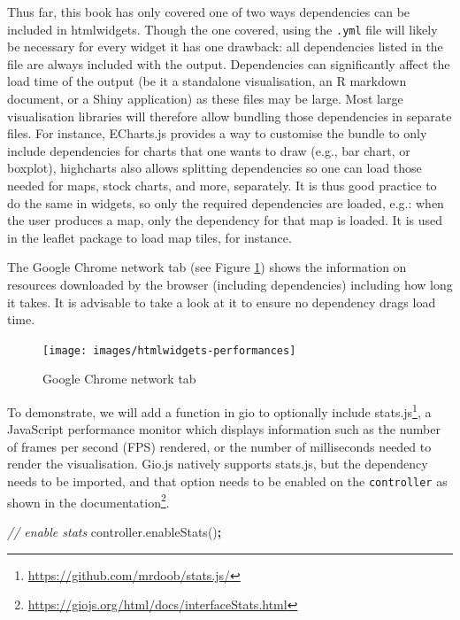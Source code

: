 \documentclass[10pt,]{krantz}
\makeatletter
\newenvironment{Shaded}{\begin{snugshade}}{\end{snugshade}}
\newcommand{\AttributeTok}[1]{\textcolor[rgb]{0.61,0.61,0.61}{#1}}
\newcommand{\CommentTok}[1]{\textcolor[rgb]{0.37,0.37,0.37}{\textit{#1}}}
\newcommand{\NormalTok}[1]{#1}
\newcommand{\OperatorTok}[1]{\textcolor[rgb]{0.43,0.43,0.43}{\textbf{#1}}}
\newcommand{\VariableTok}[1]{\textcolor[rgb]{0,0,0}{#1}}
\renewcommand{\href}[2]{#2\footnote{\url{#1}}}
\newenvironment{kframe}{%
\medskip{}
\setlength{\fboxsep}{.8em}
 \def\at@end@of@kframe{}%
 \ifinner\ifhmode%
  \def\at@end@of@kframe{\end{minipage}}%
  \begin{minipage}{\columnwidth}%
 \fi\fi%
 \def\FrameCommand##1{\hskip\@totalleftmargin \hskip-\fboxsep
 \colorbox{shadecolor}{##1}\hskip-\fboxsep
     \hskip-\linewidth \hskip-\@totalleftmargin \hskip\columnwidth}%
 \MakeFramed {\advance\hsize-\width
   \@totalleftmargin\z@ \linewidth\hsize
   \@setminipage}}%
 {\par\unskip\endMakeFramed%
 \at@end@of@kframe}
\renewenvironment{Shaded}{\begin{kframe}}{\end{kframe}}
\makeatother
\begin{document}
Thus far, this book has only covered one of two ways dependencies can be included in htmlwidgets. Though the one covered, using the \texttt{.yml} file will likely be necessary for every widget it has one drawback: all dependencies listed in the file are always included with the output. Dependencies can significantly affect the load time of the output (be it a standalone visualisation, an R markdown document, or a Shiny application) as these files may be large. Most large visualisation libraries will therefore allow bundling those dependencies in separate files. For instance, ECharts.js provides a way to customise the bundle to only include dependencies for charts that one wants to draw (e.g., bar chart, or boxplot), highcharts also allows splitting dependencies so one can load those needed for maps, stock charts, and more, separately. It is thus good practice to do the same in widgets, so only the required dependencies are loaded, e.g.: when the user produces a map, only the dependency for that map is loaded. It is used in the leaflet package to load map tiles, for instance.

The Google Chrome network tab (see Figure \ref{fig:htmlwidgets-performances}) shows the information on resources downloaded by the browser (including dependencies) including how long it takes. It is advisable to take a look at it to ensure no dependency drags load time.

\begin{figure}[H]

{\centering \texttt{[image: images/htmlwidgets-performances]} 

}

\caption{Google Chrome network tab}\label{fig:htmlwidgets-performances}
\end{figure}

To demonstrate, we will add a function in gio to optionally include \href{https://github.com/mrdoob/stats.js/}{stats.js}, a JavaScript performance monitor which displays information such as the number of frames per second (FPS) rendered, or the number of milliseconds needed to render the visualisation. Gio.js natively supports stats.js, but the dependency needs to be imported, and that option needs to be enabled on the \texttt{controller} as shown in the \href{https://giojs.org/html/docs/interfaceStats.html}{documentation}.

\begin{Shaded}
\begin{Highlighting}[]
\CommentTok{// enable stats}
\VariableTok{controller}\NormalTok{.}\AttributeTok{enableStats}\NormalTok{()}\OperatorTok{;}
\end{Highlighting}
\end{Shaded}
\end{document}
